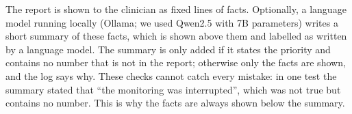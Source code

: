 The report is shown to the clinician as fixed lines of facts. Optionally, a language model running locally (Ollama; we used Qwen2.5 with 7B parameters) writes a short summary of these facts, which is shown above them and labelled as written by a language model. The summary is only added if it states the priority and contains no number that is not in the report; otherwise only the facts are shown, and the log says why. These checks cannot catch every mistake: in one test the summary stated that ``the monitoring was interrupted'', which was not true but contains no number. This is why the facts are always shown below the summary.
